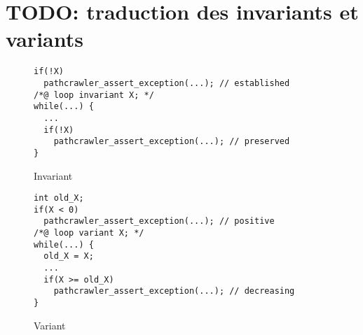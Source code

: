 \section{TODO: traduction des invariants et variants}

\begin{figure}[h]
  \begin{lstlisting}
if(!X)
  pathcrawler_assert_exception(...); // established
/*@ loop invariant X; */
while(...) {
  ...
  if(!X)
    pathcrawler_assert_exception(...); // preserved
}
  \end{lstlisting}
  \caption{Invariant}
\end{figure}

\begin{figure}[h]
  \begin{lstlisting}
int old_X;
if(X < 0)
  pathcrawler_assert_exception(...); // positive
/*@ loop variant X; */
while(...) {
  old_X = X;
  ...
  if(X >= old_X)
    pathcrawler_assert_exception(...); // decreasing
}
  \end{lstlisting}
  \caption{Variant}
\end{figure}

